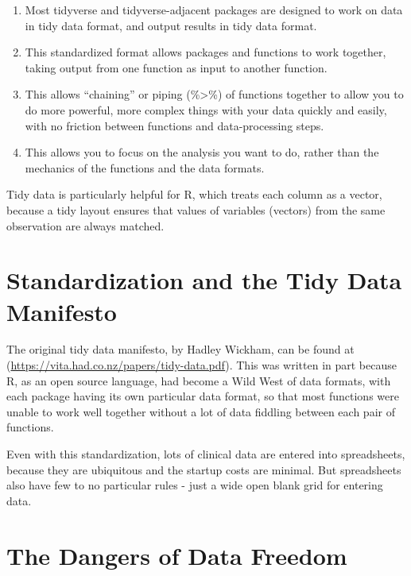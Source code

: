 \documentclass[
]{book}
\providecommand{\tightlist}{%
  \setlength{\itemsep}{0pt}\setlength{\parskip}{0pt}}
\begin{document}
\begin{enumerate}
\def\labelenumi{\arabic{enumi}.}
\tightlist
\item
  Most tidyverse and tidyverse-adjacent packages are designed to work on data in tidy data format, and output results in tidy data format.
\item
  This standardized format allows packages and functions to work together, taking output from one function as input to another function.
\item
  This allows ``chaining'' or piping (\%\textgreater\%) of functions together to allow you to do more powerful, more complex things with your data quickly and easily, with no friction between functions and data-processing steps.
\item
  This allows you to focus on the analysis you want to do, rather than the mechanics of the functions and the data formats.
\end{enumerate}

Tidy data is particularly helpful for R, which treats each column as a vector, because a tidy layout ensures that values of variables (vectors) from the same observation are always matched.

\hypertarget{standardization-and-the-tidy-data-manifesto}{%
\section{Standardization and the Tidy Data Manifesto}\label{standardization-and-the-tidy-data-manifesto}}

The original tidy data manifesto, by Hadley Wickham, can be found at (\url{https://vita.had.co.nz/papers/tidy-data.pdf}). This was written in part because R, as an open source language, had become a Wild West of data formats, with each package having its own particular data format, so that most functions were unable to work well together without a lot of data fiddling between each pair of functions.

Even with this standardization, lots of clinical data are entered into spreadsheets, because they are ubiquitous and the startup costs are minimal. But spreadsheets also have few to no particular rules - just a wide open blank grid for entering data.

\hypertarget{the-dangers-of-data-freedom}{%
\section{The Dangers of Data Freedom}\label{the-dangers-of-data-freedom}}
\end{document}
